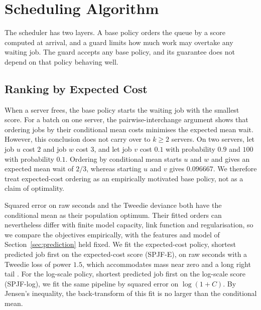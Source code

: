 \providecommand{\devnum}[1]{#1}

\section{Scheduling Algorithm}
\label{sec:scheduling}

The scheduler has two layers. A base policy orders the queue by a score computed at
arrival, and a guard limits how much work may overtake any waiting job. The guard accepts
any base policy, and its guarantee does not depend on that policy behaving well.

\subsection{Ranking by Expected Cost}
\label{sec:rank}

When a server frees, the base policy starts the waiting job with the smallest score. For a
batch on one server, the pairwise-interchange argument shows that ordering jobs by their
conditional mean costs minimises the expected mean wait. However, this conclusion does not carry over to $k \ge 2$ servers. On two
servers, let job $u$ cost $2$ and job $w$ cost $3$, and let job $v$ cost $0.1$ with
probability $0.9$ and $100$ with probability $0.1$. Ordering by conditional mean starts $u$
and $w$ and gives an expected mean wait of $2/3$, whereas starting $u$ and $v$ gives
$0.096667$. We therefore treat expected-cost ordering as an empirically motivated base
policy, not as a claim of optimality.

Squared error on raw seconds and the Tweedie deviance both have the conditional mean as
their population optimum. Their fitted orders can nevertheless differ with finite model
capacity, link function and regularisation, so we compare the objectives empirically, with
the features and model of Section~\ref{sec:prediction} held fixed. We fit the expected-cost
policy, shortest predicted job first on the expected-cost score (SPJF-E), on raw seconds
with a Tweedie loss of power $1.5$, which accommodates mass near zero and a long right tail
\cite{jorgensen1987edm,yang2018tweedieboost}. For the log-scale policy, shortest predicted
job first on the log-scale score (SPJF-log), we fit the same pipeline by squared error on
$\log(1+C)$. By Jensen's inequality, the back-transform of this fit is no larger than the
conditional mean.

